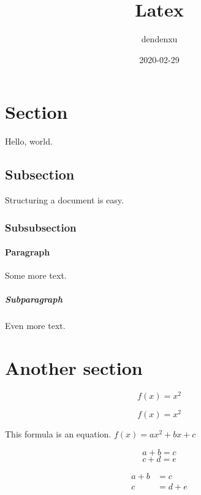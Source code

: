 \documentclass{article}
\title{Latex}
\date{2020-02-29}
\author{dendenxu}
\begin{document}
\maketitle
{}

\newpage
\doublespacing
\tableofcontents
\singlespacing


\newpage
{}

\section{Section}
Hello, world.
\subsection{Subsection}
Structuring a document is easy.
\subsubsection{Subsubsection}
\paragraph{Paragraph}

Some more text.

\subparagraph{Subparagraph}

Even more text.

\section{Another section}

\begin{equation}
    f(x) = x^2
\end{equation}

\begin{equation*}
    f(x) = x^2
\end{equation*}

This formula is an equation. $f(x) = ax^2+bx+c$

\begin{equation*}
    a + b = c
\end{equation*}
\begin{equation*}
    c + d = e
\end{equation*}

\begin{align*}
    a + b & = c     \\
    c     & = d + e
\end{align*}
\end{document}
